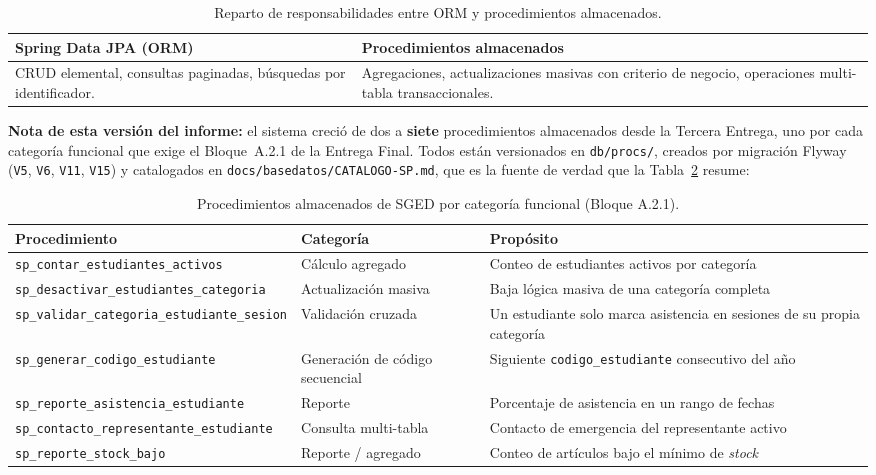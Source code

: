 \documentclass[11pt,a4paper]{article}
\newcommand{\ruta}[1]{\texttt{\footnotesize #1}}
\begin{document}
\begin{table}[htbp]
\centering
\caption{Reparto de responsabilidades entre ORM y procedimientos almacenados.}
\label{tab:reparto-orm-sp}
\begin{tabular}{@{}p{7.3cm}p{7.3cm}@{}}
\toprule
\textbf{Spring Data JPA (ORM)} & \textbf{Procedimientos almacenados} \\
\midrule
CRUD elemental, consultas paginadas, búsquedas por identificador. &
Agregaciones, actualizaciones masivas con criterio de negocio, operaciones
multi-tabla transaccionales. \\
\bottomrule
\end{tabular}
\end{table}

\textbf{Nota de esta versión del informe:} el sistema creció de dos a
\textbf{siete} procedimientos almacenados desde la Tercera Entrega, uno
por cada categoría funcional que exige el Bloque~A.2.1 de la Entrega
Final. Todos están versionados en \ruta{db/procs/}, creados por
migración Flyway~\cite{flyway} (\texttt{V5}, \texttt{V6}, \texttt{V11},
\texttt{V15}) y catalogados en \ruta{docs/basedatos/CATALOGO-SP.md}, que
es la fuente de verdad que la Tabla~\ref{tab:procs} resume:

\begin{table}[htbp]
\centering
\caption{Procedimientos almacenados de SGED por categoría funcional (Bloque A.2.1).}
\label{tab:procs}
\begin{tabular}{@{}p{4.6cm}p{3.1cm}p{6.2cm}@{}}
\toprule
\textbf{Procedimiento} & \textbf{Categoría} & \textbf{Propósito} \\
\midrule
\texttt{sp\_contar\_estudiantes\_activos} & Cálculo agregado & Conteo de estudiantes activos por categoría \\
\texttt{sp\_desactivar\_estudiantes\_categoria} & Actualización masiva & Baja lógica masiva de una categoría completa \\
\texttt{sp\_validar\_categoria\_estudiante\_sesion} & Validación cruzada & Un estudiante solo marca asistencia en sesiones de su propia categoría \\
\texttt{sp\_generar\_codigo\_estudiante} & Generación de código secuencial & Siguiente \texttt{codigo\_estudiante} consecutivo del año \\
\texttt{sp\_reporte\_asistencia\_estudiante} & Reporte & Porcentaje de asistencia en un rango de fechas \\
\texttt{sp\_contacto\_representante\_estudiante} & Consulta multi-tabla & Contacto de emergencia del representante activo \\
\texttt{sp\_reporte\_stock\_bajo} & Reporte / agregado & Conteo de artículos bajo el mínimo de \emph{stock} \\
\bottomrule
\end{tabular}
\end{table}
\end{document}
